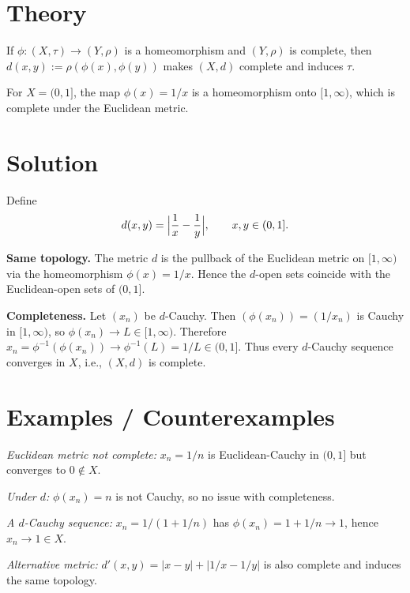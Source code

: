 \documentclass[12pt,a4paper]{article}
\theoremstyle{plain}
\theoremstyle{definition}
\theoremstyle{remark}
\theoremstyle{remark}
\begin{document}
\smallskip

\section*{Theory}

If \(\phi:(X,\tau)\to(Y,\rho)\) is a homeomorphism and \((Y,\rho)\) is complete, then
\(d(x,y):=\rho(\phi(x),\phi(y))\) makes \((X,d)\) complete and induces \(\tau\).

For \(X=(0,1]\), the map \(\phi(x)=1/x\) is a homeomorphism onto \([1,\infty)\),
which is complete under the Euclidean metric.

\smallskip

\section*{Solution}

Define
\[
d(x,y)=\Bigl|\frac{1}{x}-\frac{1}{y}\Bigr|,\qquad x,y\in(0,1].
\]

\noindent\textbf{Same topology.}
The metric \(d\) is the pullback of the Euclidean metric on \([1,\infty)\) via the homeomorphism \(\phi(x)=1/x\).
Hence the \(d\)-open sets coincide with the Euclidean-open sets of \((0,1]\).

\smallskip

\noindent\textbf{Completeness.}
Let \((x_n)\) be \(d\)-Cauchy. Then \((\phi(x_n))=(1/x_n)\) is Cauchy in \([1,\infty)\),
so \(\phi(x_n)\to L\in[1,\infty)\).
Therefore \(x_n=\phi^{-1}(\phi(x_n))\to \phi^{-1}(L)=1/L\in(0,1]\).
Thus every \(d\)-Cauchy sequence converges in \(X\), i.e., \((X,d)\) is complete.

\smallskip

\section*{Examples / Counterexamples}

\emph{Euclidean metric not complete:}
\(x_n=1/n\) is Euclidean-Cauchy in \((0,1]\) but converges to \(0\notin X\).

\smallskip

\emph{Under \(d\):}
\(\phi(x_n)=n\) is not Cauchy, so no issue with completeness.

\smallskip

\emph{A \(d\)-Cauchy sequence:}
\(x_n=1/(1+1/n)\) has \(\phi(x_n)=1+1/n\to 1\), hence \(x_n\to 1\in X\).

\smallskip

\emph{Alternative metric:}
\(d'(x,y)=|x-y|+\bigl|1/x-1/y\bigr|\) is also complete and induces the same topology.
\end{document}
